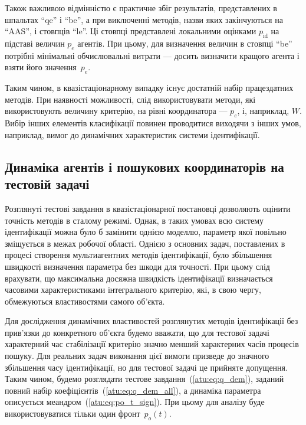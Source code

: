 Також важливою відмінністю є практичне збіг результатів,
представлених в шпальтах ``qe'' і ``be'', а при виключенні методів,
назви яких закінчуються на ``AAS'', і стовпців ``le''. Ці стовпці
представлені локальними оцінками
$ p_\mathrm{id} $ на підставі величин
$ p_e $ агентів. При цьому, для визначення величин в стовпці ``be''
потрібні мінімальні обчислювальні витрати --- досить визначити
кращого агента і взяти його значення~$ p_e $.

Таким чином, в квазістаціонарному випадку існує достатній набір працездатних
методів. При наявності можливості, слід використовувати методи, які
використовують величину критерію, на рівні координатора --- $p_e$, і,
наприклад, $W$. Вибір інших елементів класифікації повинен проводитися
виходячи з інших умов, наприклад, вимог до динамічних характеристик системи
ідентифікації.



\subsection{Динаміка агентів і пошукових координаторів на тестовій задачі}%

Розглянуті тестові завдання в квазістаціонарної постановці
дозволяють оцінити точність методів в сталому режимі. Однак, в
таких умовах всю систему ідентифікації можна було б замінити
однією моделлю, параметр якої повільно зміщується в межах
робочої області. Однією з основних задач, поставлених в
процесі створення мультиагентних методів ідентифікації,
було збільшення швидкості визначення параметра без шкоди
для точності. При цьому слід врахувати, що максимальна
досяжна швидкість ідентифікації визначається часовими
характеристиками інтегрального критерію, які, в свою чергу,
обмежуються властивостями самого об'єкта.

Для дослідження динамічних властивостей розглянутих методів ідентифікації без
прив'язки до конкретного об'єкта будемо вважати, що для тестової задачі
характерний час стабілізації критерію значно менший характерних часів процесів
пошуку.
%
Для реальних задач виконання цієї вимоги призведе до
значного збільшення часу ідентифікації, но для тестової задачі
це прийняте допущення.
%
Таким чином, будемо розглядати тестове завдання~(\ref{atu:eq:q_dem}),
заданий повний набір коефіцієнтів~(\ref{atu:eq:q_dem_all}),
а динаміка параметра описується меандром~(\ref{atu:eq:po_t_sign}).
При цьому для аналізу буде використовуватися тільки один фронт~$p_o(t)$.

